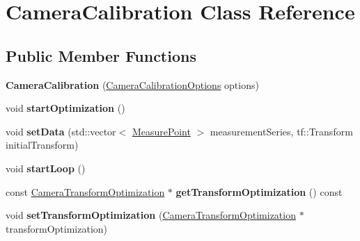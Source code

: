 \hypertarget{classCameraCalibration}{\section{\-Camera\-Calibration \-Class \-Reference}
\label{classCameraCalibration}
}
\subsection*{\-Public \-Member \-Functions}
\begin{DoxyCompactItemize}
\item 
\hypertarget{classCameraCalibration_adadb438daab6669517b1bc617676529d}{{\bfseries \-Camera\-Calibration} (\hyperlink{classCameraCalibrationOptions}{\-Camera\-Calibration\-Options} options)}\label{classCameraCalibration_adadb438daab6669517b1bc617676529d}

\item 
\hypertarget{classCameraCalibration_af7a69e0088701c48242b375c9e4cd7e0}{void {\bfseries start\-Optimization} ()}\label{classCameraCalibration_af7a69e0088701c48242b375c9e4cd7e0}

\item 
\hypertarget{classCameraCalibration_a1d670d71bb381cd092115491edaf4dea}{void {\bfseries set\-Data} (std\-::vector$<$ \hyperlink{classCameraMeasurePoint}{\-Measure\-Point} $>$ measurement\-Series, tf\-::\-Transform initial\-Transform)}\label{classCameraCalibration_a1d670d71bb381cd092115491edaf4dea}

\item 
\hypertarget{classCameraCalibration_a2a4c7aa5a6adcfc88d0d2537e31640c9}{void {\bfseries start\-Loop} ()}\label{classCameraCalibration_a2a4c7aa5a6adcfc88d0d2537e31640c9}

\item 
\hypertarget{classCameraCalibration_afa9ebb2c505f52ffe92954c1a50b6227}{const \hyperlink{classCameraTransformOptimization}{\-Camera\-Transform\-Optimization} $\ast$ {\bfseries get\-Transform\-Optimization} () const }\label{classCameraCalibration_afa9ebb2c505f52ffe92954c1a50b6227}

\item 
\hypertarget{classCameraCalibration_aca396b1f90004b521b7716f9ca303c80}{void {\bfseries set\-Transform\-Optimization} (\hyperlink{classCameraTransformOptimization}{\-Camera\-Transform\-Optimization} $\ast$transform\-Optimization)}\label{classCameraCalibration_aca396b1f90004b521b7716f9ca303c80}

\end{DoxyCompactItemize}
